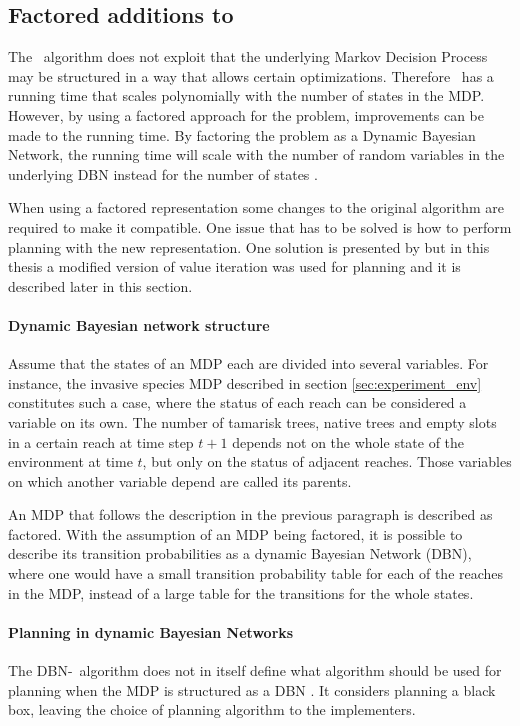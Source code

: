 \subsection{Factored additions to \etre\ }
\label{sec:factored_e3}

The \etre\ algorithm does not exploit that the underlying Markov Decision Process may be structured in a way that allows certain optimizations. Therefore \etre\ has a running time that scales polynomially with the number of states in the MDP. However, by using a factored approach for the problem, improvements can be made to the running time. By factoring the problem as a Dynamic Bayesian Network, the running time will scale with the number of random variables in the underlying DBN instead for the number of states \parencite{kearns1999efficient}. 

When using a factored representation some changes to the original algorithm are required to make it compatible. One issue that has to be solved is how to perform  planning with the new representation. One solution is presented by \textcite{dean1999descision} but in this thesis a modified version of value iteration was used for planning and it is described later in this section.

\paragraph{Dynamic Bayesian network structure}
Assume that the states of an MDP each are divided into several variables. For instance, the invasive species MDP described in section \ref{sec:experiment_env} constitutes such a case, where the status of each reach can be considered a variable on its own. The number of tamarisk trees, native trees and empty slots in a certain reach at time step $t+1$ depends not on the whole state of the environment at time $t$, but only on the status of adjacent reaches. Those variables on which another variable depend are called its parents.  

An MDP that follows the description in the previous paragraph is described as  factored. With the assumption of an MDP being factored, it is possible to describe its transition probabilities as a dynamic Bayesian Network (DBN), where one would have a small transition probability table for each of the reaches in the MDP, instead of a large table for the transitions for the whole states.

\paragraph{Planning in dynamic Bayesian Networks}
The DBN-\etre\ algorithm does not in itself define what algorithm should be used for planning when the MDP is structured as a DBN \parencite{kearns1999efficient}. It considers planning a black box, leaving the choice of planning algorithm to the implementers. 

